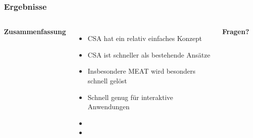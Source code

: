 \documentclass[aspectratio=169]{beamer}
\begin{document}

\begin{frame}
	\frametitle{Ergebnisse}
	\begin{columns}[c] %
	
	\textbf{Zusammenfassung}
	\begin{itemize}
		\item CSA hat ein relativ einfaches Konzept
		\item CSA ist schneller als bestehende Ansätze
		\item Insbesondere MEAT wird besonders schnell gelöst
		\item Schnell genug für interaktive Anwendungen \pause
		\item []
		\item []
	\end{itemize}
	\centering
	\textbf{Fragen?}

		
\end{columns}
\end{frame}
	

\end{document}
